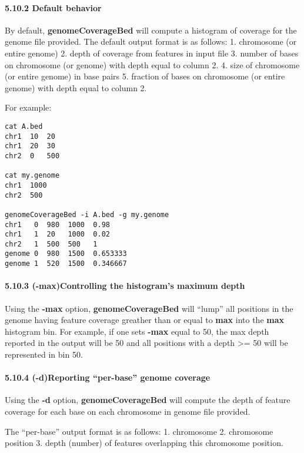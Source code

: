 \documentclass[letterpaper,10pt,english]{sphinxmanual}
\begin{document}
\paragraph{5.10.2 Default behavior}
\label{content/genomecoverageBed:default-behavior}
By default, \textbf{genomeCoverageBed} will compute a histogram of coverage for the genome file provided.
The default output format is as follows:
1. chromosome (or entire genome)
2. depth of coverage from features in input file
3. number of bases on chromosome (or genome) with depth equal to column 2.
4. size of chromosome (or entire genome) in base pairs
5. fraction of bases on chromosome (or entire genome) with depth equal to column 2.

For example:

\begin{Verbatim}[commandchars=\\\{\}]
cat A.bed
chr1  10  20
chr1  20  30
chr2  0   500

cat my.genome
chr1  1000
chr2  500

genomeCoverageBed -i A.bed -g my.genome
chr1   0  980  1000  0.98
chr1   1  20   1000  0.02
chr2   1  500  500   1
genome 0  980  1500  0.653333
genome 1  520  1500  0.346667
\end{Verbatim}


\paragraph{5.10.3 (-max)Controlling the histogram's maximum depth}
\label{content/genomecoverageBed:max-controlling-the-histogram-s-maximum-depth}
Using the \textbf{-max} option, \textbf{genomeCoverageBed} will ``lump'' all positions in the genome having feature
coverage greather than or equal to \textbf{max} into the \textbf{max} histogram bin. For example, if one sets \textbf{-max}
equal to 50, the max depth reported in the output will be 50 and all positions with a depth \textgreater{}= 50 will
be represented in bin 50.


\paragraph{5.10.4 (-d)Reporting ``per-base'' genome coverage}
\label{content/genomecoverageBed:d-reporting-per-base-genome-coverage}
Using the \textbf{-d} option, \textbf{genomeCoverageBed} will compute the depth of feature coverage for each base
on each chromosome in genome file provided.

The ``per-base'' output format is as follows:
1. chromosome
2. chromosome position
3. depth (number) of features overlapping this chromosome position.
\end{document}

